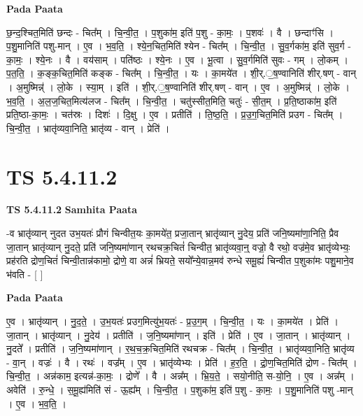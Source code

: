\documentclass[17pt]{extarticle}
\begin{document}
\textbf{Pada Paata} \newline

छ॒न्द॒श्चित॒मिति॑ छन्दः - चित᳚म् । चि॒न्वी॒त॒ । प॒शुका॑म॒ इति॑ प॒शु - का॒मः॒ । प॒शवः॑ । वै । छन्दाꣳ॑सि । प॒शु॒मानिति॑ पशु-मान् । ए॒व । भ॒व॒ति॒ । श्ये॒न॒चित॒मिति॑ श्येन - चित᳚म् । चि॒न्वी॒त॒ । सु॒व॒र्गका॑म॒ इति॑ सुव॒र्ग - का॒मः॒ । श्ये॒नः । वै । वय॑साम् । पति॑ष्ठः । श्ये॒नः । ए॒व । भू॒त्वा । सु॒व॒र्गमिति॑ सुवः - गम् । लो॒कम् । प॒त॒ति॒ । क॒ङ्क॒चित॒मिति॑ कङ्क - चित᳚म् । चि॒न्वी॒त॒ । यः । का॒मये॑त । शी॒र्.॒ष॒ण्वानिति॑ शीर्.षण् - वान् । अ॒मुष्मिन्न्॑ । लो॒के । स्या॒म् । इति॑ । शी॒र्.॒ष॒ण्वानिति॑ शीर्.षण् - वान् । ए॒व । अ॒मुष्मिन्न्॑ । लो॒के । भ॒व॒ति॒ । अ॒ल॒ज॒चित॒मित्य॑लज - चित᳚म् । चि॒न्वी॒त॒ । चतु॑स्सीत॒मिति॒ चतुः॑ - सी॒त॒म् । प्र॒ति॒ष्ठाका॑म॒ इति॑ प्रति॒ष्ठा-का॒मः॒ । चत॑स्रः । दिशः॑ । दि॒क्षु । ए॒व । प्रतीति॑ । ति॒ष्ठ॒ति॒ । प्र॒उ॒ग॒चित॒मिति॑ प्र‌उग - चित᳚म् । चि॒न्वी॒त॒ । भ्रातृ॑व्यवा॒निति॒ भ्रातृ॑व्य - वान् । प्रेति॑ ।  \newline





\section{ TS 5.4.11.2 }

\textbf{TS 5.4.11.2 } \newline
\textbf{Samhita Paata} \newline

-व भ्रातृ॑व्यान् नुदत उभ॒यतः॑ प्रौगं चिन्वीत॒यः का॒मये॑त॒ प्रजा॒तान् भ्रातृ॑व्यान् नु॒देय॒ प्रति॑ जनि॒ष्यमा॑णा॒निति॒ प्रैव जा॒तान् भ्रातृ॑व्यान् नु॒दते॒ प्रति॑ जनि॒ष्यमा॑णान् रथचक्र॒चितं॑ चिन्वीत॒ भ्रातृ॑व्यवा॒न्॒ वज्रो॒ वै रथो॒ वज्र॑मे॒व भ्रातृ॑व्येभ्यः॒ प्रह॑रति द्रोण॒चितं॑ चिन्वी॒तान्न॑कामो॒ द्रोणे॒ वा अन्नं॑ भ्रियते॒ सयो᳚न्ये॒वान्न॒मव॑ रुन्धे समू॒ह्यं॑ चिन्वीत प॒शुका॑मः पशु॒माने॒व भ॑वति - [  ] \newline

\textbf{Pada Paata} \newline

ए॒व । भ्रातृ॑व्यान् । नु॒द॒ते॒ । उ॒भ॒यतः॑ प्र‌उग॒मित्यु॑भ॒यतः॑ - प्र॒उ॒ग॒म् । चि॒न्वी॒त॒ । यः । का॒मये॑त । प्रेति॑ । जा॒तान् । भ्रातृ॑व्यान् । नु॒देय॑ । प्रतीति॑ । ज॒नि॒ष्यमा॑णान् । इति॑ । प्रेति॑ । ए॒व । जा॒तान् । भ्रातृ॑व्यान् । नु॒दते᳚ । प्रतीति॑ । ज॒नि॒ष्यमा॑णान् । र॒थ॒च॒क्र॒चित॒मिति॑ रथचक्र - चित᳚म् । चि॒न्वी॒त॒ । भ्रातृ॑व्यवा॒निति॒ भ्रातृ॑व्य - वा॒न् । वज्रः॑ । वै । रथः॑ । वज्र᳚म् । ए॒व । भ्रातृ॑व्येभ्यः । प्रेति॑ । ह॒र॒ति॒ । द्रो॒ण॒चित॒मिति॑ द्रोण - चित᳚म् । चि॒न्वी॒त॒ । अन्न॑काम॒ इत्यन्न॑-का॒मः॒ । द्रोणे᳚ । वै । अन्न᳚म् । भ्रि॒य॒ते॒ । सयो॒नीति॒ स-यो॒नि॒ । ए॒व । अन्न᳚म् । अवेति॑ । रु॒न्धे॒ । स॒मू॒ह्य॑मिति॑ सं - ऊ॒ह्य᳚म् । चि॒न्वी॒त॒ । प॒शुका॑म॒ इति॑ प॒शु - का॒मः॒ । प॒शु॒मानिति॑ पशु -मान् । ए॒व । भ॒व॒ति॒ ।  \newline
\end{document}
